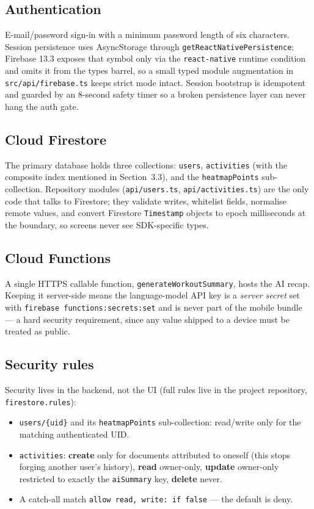 \documentclass[12pt, a4paper]{report}
\newcommand{\code}[1]{\texttt{#1}}
\begin{document}
\subsection{Authentication}
E-mail/password sign-in with a minimum password length of six characters.
Session persistence uses AsyncStorage through
\code{getReactNativePersistence}; Firebase 13.3 exposes that symbol only via
the \code{react-native} runtime condition and omits it from the types
barrel, so a small typed module augmentation in \code{src/api/firebase.ts}
keeps strict mode intact. Session bootstrap is idempotent and guarded by an
8-second safety timer so a broken persistence layer can never hang the auth
gate.

\subsection{Cloud Firestore}
The primary database holds three collections: \code{users}, \code{activities}
(with the composite index mentioned in Section~3.3), and the
\code{heatmapPoints} sub-collection. Repository modules
(\code{api/users.ts}, \code{api/activities.ts}) are the only code that talks
to Firestore; they validate writes, whitelist fields, normalise remote
values, and convert Firestore \code{Timestamp} objects to epoch milliseconds
at the boundary, so screens never see SDK-specific types.

\subsection{Cloud Functions}
A single HTTPS callable function, \code{generateWorkoutSummary}, hosts the
AI recap. Keeping it server-side means the language-model API key is a
\emph{server secret} set with \code{firebase functions:secrets:set} and is
never part of the mobile bundle --- a hard security requirement, since any
value shipped to a device must be treated as public.

\subsection{Security rules}
Security lives in the backend, not the UI (full rules live in the project
repository, \code{firestore.rules}):

\begin{itemize}[leftmargin=1.2cm]
  \item \code{users/\{uid\}} and its \code{heatmapPoints} sub-collection:
        read/write only for the matching authenticated UID.
  \item \code{activities}: \textbf{create} only for documents attributed to
        oneself (this stops forging another user's history), \textbf{read}
        owner-only, \textbf{update} owner-only restricted to exactly the
        \code{aiSummary} key, \textbf{delete} never.
  \item A catch-all match \code{allow read, write: if false} --- the default
        is deny.
\end{itemize}
\end{document}
